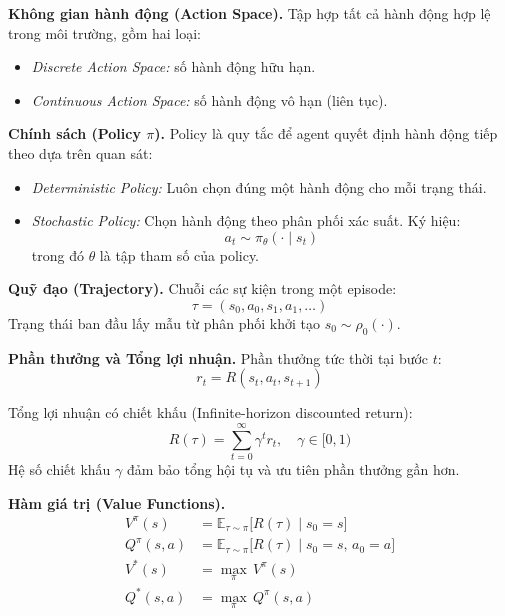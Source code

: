 \textbf{Không gian hành động (Action Space).}
Tập hợp tất cả hành động hợp lệ trong môi trường, gồm hai loại:
\begin{itemize}
    \item \textit{Discrete Action Space:} số hành động hữu hạn.
    \item \textit{Continuous Action Space:} số hành động vô hạn (liên tục).
\end{itemize}

\textbf{Chính sách (Policy $\pi$).}
Policy là quy tắc để agent quyết định hành động tiếp theo dựa trên quan sát:
\begin{itemize}
    \item \textit{Deterministic Policy:} Luôn chọn đúng một hành động cho mỗi
    trạng thái.
    \item \textit{Stochastic Policy:} Chọn hành động theo phân phối xác suất.
    Ký hiệu:
    \begin{equation}
        a_t \sim \pi_\theta(\cdot \mid s_t)
        \label{eq:stochastic_policy}
    \end{equation}
    trong đó $\theta$ là tập tham số của policy.
\end{itemize}

\textbf{Quỹ đạo (Trajectory).}
Chuỗi các sự kiện trong một episode:
\begin{equation}
    \tau = (s_0, a_0, s_1, a_1, \ldots)
\end{equation}
Trạng thái ban đầu lấy mẫu từ phân phối khởi tạo $s_0 \sim \rho_0(\cdot)$.

\textbf{Phần thưởng và Tổng lợi nhuận.}
Phần thưởng tức thời tại bước $t$:
\begin{equation}
    r_t = R(s_t, a_t, s_{t+1})
\end{equation}

Tổng lợi nhuận có chiết khấu (Infinite-horizon discounted return):
\begin{equation}
    R(\tau) = \sum_{t=0}^{\infty} \gamma^t r_t, \quad \gamma \in [0,1)
\end{equation}
Hệ số chiết khấu $\gamma$ đảm bảo tổng hội tụ và ưu tiên phần thưởng gần hơn.

\textbf{Hàm giá trị (Value Functions).}
\begin{align}
    V^\pi(s) &= \mathbb{E}_{\tau \sim \pi}\bigl[R(\tau) \mid s_0 = s\bigr]
    \label{eq:Vpi}\\
    Q^\pi(s,a) &= \mathbb{E}_{\tau \sim \pi}\bigl[R(\tau) \mid s_0=s,\, a_0=a\bigr]
    \label{eq:Qpi}\\
    V^*(s) &= \max_\pi\, V^\pi(s) \label{eq:Vstar}\\
    Q^*(s,a) &= \max_\pi\, Q^\pi(s,a) \label{eq:Qstar}
\end{align}

